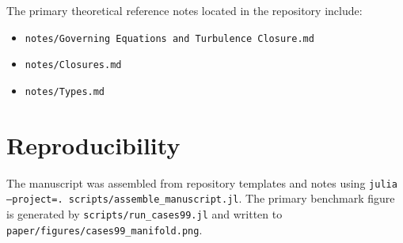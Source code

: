 \documentclass[11pt]{article}
\begin{document}
The primary theoretical reference notes located in the repository include:
\begin{itemize}
    \item \texttt{notes/Governing\ Equations\ and\ Turbulence\ Closure.md}
    \item \texttt{notes/Closures.md}
    \item \texttt{notes/Types.md}
\end{itemize}

\section{Reproducibility}
The manuscript was assembled from repository templates and notes using
\texttt{julia --project=. scripts/assemble\_manuscript.jl}. The primary benchmark
figure is generated by \texttt{scripts/run\_cases99.jl} and written to
\texttt{paper/figures/cases99\_manifold.png}.

\clearpage

\nocite{*}



\end{document}

